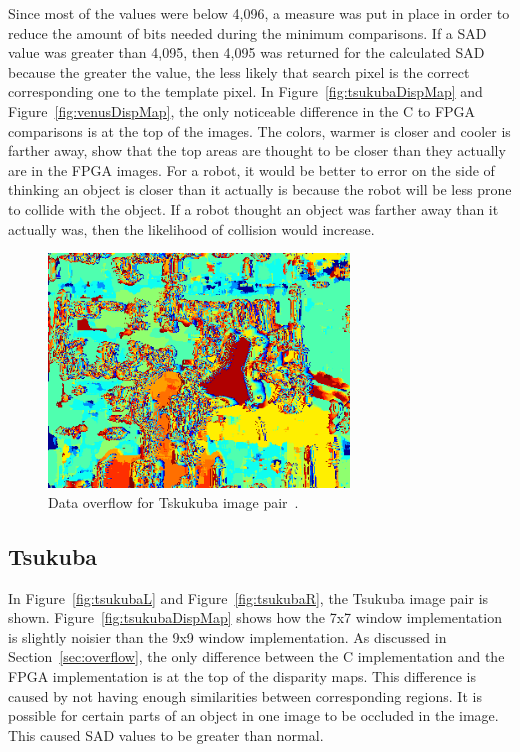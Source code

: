 Since most of the values were below 4,096, a measure was put in place in order to reduce the amount of bits needed during the minimum comparisons. If a SAD value was greater than 4,095, then 4,095 was returned for the calculated SAD because the greater the value, the less likely that search pixel is the correct corresponding one to the template pixel. In Figure~\ref{fig:tsukubaDispMap} and Figure~\ref{fig:venusDispMap}, the only noticeable difference in the C to FPGA comparisons is at the top of the images. The colors, warmer is closer and cooler is farther away, show that the top areas are thought to be closer than they actually are in the FPGA images. For a robot, it would be better to error on the side of thinking an object is closer than it actually is because the robot will be less prone to collide with the object. If a robot thought an object was farther away than it actually was, then the likelihood of collision would increase.

\begin{figure}[h]
	\begin{center}
		\includegraphics[width=80mm]{figures/tsukuba_disp9x9_2_sad_overflow.png}
		\captionfonts
		\caption{Data overflow for Tskukuba image pair~\cite{middlebury}.}
		\label{fig:overflow}
	\end{center}
\end{figure}

\subsection{Tsukuba}
\label{sec:tsukuba}

In Figure~\ref{fig:tsukubaL} and Figure~\ref{fig:tsukubaR}, the Tsukuba image pair is shown. Figure~\ref{fig:tsukubaDispMap} shows how the 7x7 window implementation is slightly noisier than the 9x9 window implementation. As discussed in Section~\ref{sec:overflow}, the only difference between the C implementation and the FPGA implementation is at the top of the disparity maps. This difference is caused by not having enough similarities between corresponding regions. It is possible for certain parts of an object in one image to be occluded in the image. This caused SAD values to be greater than normal. 


